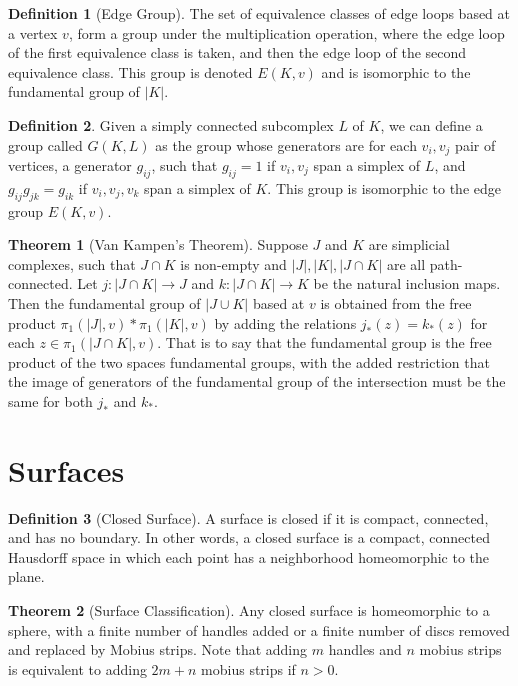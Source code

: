 \documentclass{article}
\theoremstyle{definition}
\newtheorem{definition}{Definition}[section]
\newtheorem{theorem}{Theorem}[section]
\theoremstyle{remark}
\theoremstyle{remark}
\begin{document}
\begin{definition}[Edge Group]
    The set of equivalence classes of edge loops based at a vertex $v$, form a group under the multiplication operation, where the edge loop of the first equivalence class is taken, and then the edge loop of the second equivalence class. This group is denoted $E(K, v)$ and is isomorphic to the fundamental group of $|K|$.
\end{definition}

\begin{definition}
    Given a simply connected subcomplex $L$ of $K$, we can define a group called $G(K, L)$ as the group whose generators are for each $v_i, v_j$ pair of vertices, a generator $g_{ij}$, such that $g_{ij} = 1$ if $v_i, v_j$ span a simplex of $L$, and $g_{ij}g_{jk} = g_{ik}$ if $v_i, v_j, v_k$ span a simplex of $K$. This group is isomorphic to the edge group $E(K, v)$. 
\end{definition}

\begin{theorem}[Van Kampen's Theorem]
    Suppose $J$ and $K$ are simplicial complexes, such that $J \cap K$ is non-empty and $|J|, |K|, |J\cap K|$ are all path-connected. Let $j: |J \cap K| \to J$ and $k: |J \cap K| \to K$ be the natural inclusion maps. Then the fundamental group of $|J \cup K|$ based at $v$ is obtained from the free product $\pi_1(|J|, v) * \pi_1(|K|, v)$ by adding the relations $j_{*}(z) = k_{*}(z)$ for each $z \in \pi_1(|J\cap K|, v)$. 
    That is to say that the fundamental group is the free product of the two spaces fundamental groups, with the added restriction that the image of generators of the fundamental group of the intersection must be the same for both $j_{*}$ and $k_{*}$.
\end{theorem}

\section{Surfaces}

\begin{definition}[Closed Surface]
    A surface is closed if it is compact, connected, and has no boundary. In other words, a closed surface is a compact, connected Hausdorff space in which each point has a neighborhood homeomorphic to the plane.  
\end{definition}

\begin{theorem}[Surface Classification]
     Any closed surface is homeomorphic to a sphere, with a finite number of handles added or a finite number of discs removed and replaced by Mobius strips. Note that adding $m$ handles and $n$ mobius strips is equivalent to adding $2m + n$ mobius strips if $n > 0$.  
\end{theorem}
\end{document}
